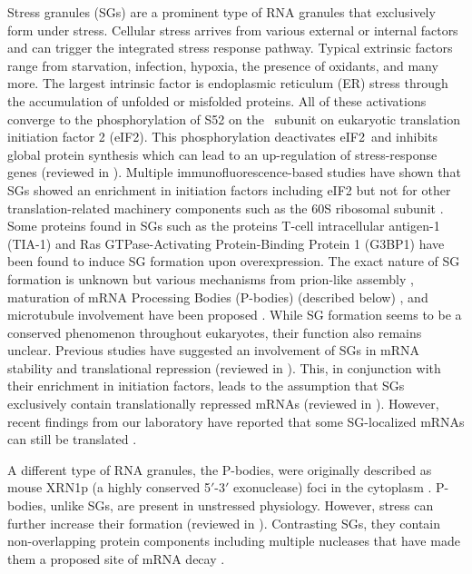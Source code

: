 Stress granules (SGs) are a prominent type of RNA granules that exclusively form under stress.
Cellular stress arrives from various external or internal factors and can trigger the integrated stress response pathway.
Typical extrinsic factors range from starvation, infection, hypoxia, the presence of oxidants, and many more.
The largest intrinsic factor is endoplasmic reticulum (ER) stress through the accumulation of unfolded or misfolded proteins.
All of these activations converge to the phosphorylation of S52 on the \textalpha\ subunit on eukaryotic translation initiation factor 2 (eIF2\textalpha).
This phosphorylation deactivates eIF2\textalpha\ and inhibits global protein synthesis which can lead to an up-regulation of stress-response genes (reviewed in \cite{pakoszebrucka_integrated_2016}).
Multiple immunofluorescence-based studies have shown that SGs showed an enrichment in initiation factors including eIF2 but not for other translation-related machinery components such as the 60S ribosomal subunit \cite{kimball_mammalian_2003}.
Some proteins found in SGs such as the proteins T-cell intracellular antigen-1 (TIA-1) \cite{kedersha_rna-binding_1999} and Ras GTPase-Activating Protein-Binding Protein 1 (G3BP1) \cite{tourriere_rasgap-associated_2003} have been found to induce SG formation upon overexpression.
The exact nature of SG formation is unknown but various mechanisms from prion-like assembly \cite{gilks_stress_2004, shattuck_prion-like_2019}, maturation of mRNA Processing Bodies (P-bodies) (described below) \cite{buchan_p_2008}, and microtubule involvement have been proposed \cite{ivanov_disruption_2003}.
While SG formation seems to be a conserved phenomenon throughout eukaryotes, their function also remains unclear.
Previous studies have suggested an involvement of SGs in mRNA stability and translational repression (reviewed in \cite{buchan_eukaryotic_2009}).
This, in conjunction with their enrichment in initiation factors, leads to the assumption that SGs exclusively contain translationally repressed mRNAs (reviewed in \cite{thomas_rna_2011}).
However, recent findings from our laboratory have reported that some SG-localized mRNAs can still be translated \cite{mateju_single-molecule_2020}.

A different type of RNA granules, the P-bodies, were originally described as mouse XRN1p (a highly conserved 5$'$-3$'$ exonuclease) foci in the cytoplasm \cite{bashkirov_mouse_1997}.
P-bodies, unlike SGs, are present in unstressed physiology.
However, stress can further increase their formation (reviewed in \cite{parker_p_2007}).
Contrasting SGs, they contain non-overlapping protein components including multiple nucleases that have made them a proposed site of mRNA decay \cite{sheth_decapping_2003}.

